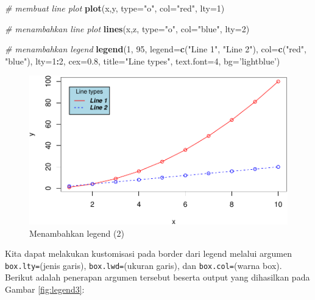 \documentclass[]{book}
\newenvironment{Shaded}{\begin{snugshade}}{\end{snugshade}}
\newcommand{\KeywordTok}[1]{\textcolor[rgb]{0.13,0.29,0.53}{\textbf{#1}}}
\newcommand{\DataTypeTok}[1]{\textcolor[rgb]{0.13,0.29,0.53}{#1}}
\newcommand{\DecValTok}[1]{\textcolor[rgb]{0.00,0.00,0.81}{#1}}
\newcommand{\FloatTok}[1]{\textcolor[rgb]{0.00,0.00,0.81}{#1}}
\newcommand{\StringTok}[1]{\textcolor[rgb]{0.31,0.60,0.02}{#1}}
\newcommand{\CommentTok}[1]{\textcolor[rgb]{0.56,0.35,0.01}{\textit{#1}}}
\newcommand{\OperatorTok}[1]{\textcolor[rgb]{0.81,0.36,0.00}{\textbf{#1}}}
\newcommand{\NormalTok}[1]{#1}
\begin{document}
\begin{Shaded}
\begin{Highlighting}[]
\CommentTok{# membuat line plot}
\KeywordTok{plot}\NormalTok{(x,y, }\DataTypeTok{type=}\StringTok{"o"}\NormalTok{, }\DataTypeTok{col=}\StringTok{"red"}\NormalTok{, }\DataTypeTok{lty=}\DecValTok{1}\NormalTok{)}

\CommentTok{# menambahkan line plot}
\KeywordTok{lines}\NormalTok{(x,z, }\DataTypeTok{type=}\StringTok{"o"}\NormalTok{, }\DataTypeTok{col=}\StringTok{"blue"}\NormalTok{, }\DataTypeTok{lty=}\DecValTok{2}\NormalTok{)}

\CommentTok{# menambahkan legend}
\KeywordTok{legend}\NormalTok{(}\DecValTok{1}\NormalTok{, }\DecValTok{95}\NormalTok{, }\DataTypeTok{legend=}\KeywordTok{c}\NormalTok{(}\StringTok{"Line 1"}\NormalTok{, }\StringTok{"Line 2"}\NormalTok{),}
       \DataTypeTok{col=}\KeywordTok{c}\NormalTok{(}\StringTok{"red"}\NormalTok{, }\StringTok{"blue"}\NormalTok{), }\DataTypeTok{lty=}\DecValTok{1}\OperatorTok{:}\DecValTok{2}\NormalTok{, }\DataTypeTok{cex=}\FloatTok{0.8}\NormalTok{,}
       \DataTypeTok{title=}\StringTok{"Line types"}\NormalTok{, }\DataTypeTok{text.font=}\DecValTok{4}\NormalTok{, }\DataTypeTok{bg=}\StringTok{'lightblue'}\NormalTok{)}
\end{Highlighting}
\end{Shaded}

\begin{figure}

{\centering \includegraphics[width=0.7\linewidth]{EnvStat_files/figure-latex/legend2-1} 

}

\caption{Menambahkan legend (2)}\label{fig:legend2}
\end{figure}

Kita dapat melakukan kustomisasi pada border dari legend melalui argumen
\texttt{box.lty=}(jenis garis), \texttt{box.lwd=}(ukuran garis), dan
\texttt{box.col=}(warna box). Berikut adalah penerapan argumen tersebut
beserta output yang dihasilkan pada Gambar \ref{fig:legend3}:
\end{document}
